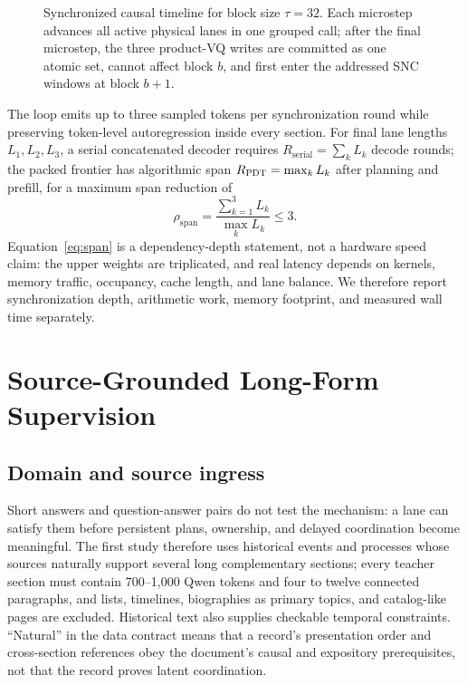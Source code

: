 \documentclass[10pt]{article}
\newcommand{\pdt}{\textsc{PDT}}
\newcommand{\M}{\mathcal{M}}
\begin{document}
\begin{figure}[t]
\caption{Synchronized causal timeline for block size \(\tau=32\). Each
microstep advances all active physical lanes in one grouped call; after the
final microstep, the three product-VQ writes are committed as one atomic set,
cannot affect block \(b\), and first enter the addressed SNC windows at block
\(b+1\).}
\label{fig:block-timeline}
\end{figure}

The loop emits up to three sampled tokens per synchronization round while
preserving token-level autoregression inside every section. For final lane
lengths \(L_1,L_2,L_3\), a serial concatenated decoder requires
\(
R_{\mathrm{serial}}=\sum_k L_k
\)
decode rounds; the packed frontier has algorithmic span
\(
R_{\pdt}=\max_k L_k
\)
after planning and prefill, for a maximum span reduction of
\begin{equation}
\label{eq:span}
\rho_{\mathrm{span}}
=\frac{\sum_{k=1}^3 L_k}{\max_k L_k}
\leq 3.
\end{equation}
Equation~\ref{eq:span} is a dependency-depth statement, not a hardware speed
claim: the upper weights are triplicated, and real latency depends on
kernels, memory traffic, occupancy, cache length, and lane balance. We
therefore report synchronization depth, arithmetic work, memory footprint,
and measured wall time separately.

\section{Source-Grounded Long-Form Supervision}
\label{sec:data}

\subsection{Domain and source ingress}

Short answers and question-answer pairs do not test the mechanism: a lane can
satisfy them before persistent plans, ownership, and delayed coordination
become meaningful. The first study therefore uses historical events and
processes whose sources naturally support several long complementary
sections; every teacher section must contain 700--1,000 Qwen tokens and four
to twelve connected paragraphs, and lists, timelines, biographies as primary
topics, and catalog-like pages are excluded. Historical text also supplies
checkable temporal constraints. ``Natural'' in the data contract means that a
record's presentation order and cross-section references obey the document's
causal and expository prerequisites, not that the record proves latent
coordination.
\end{document}
